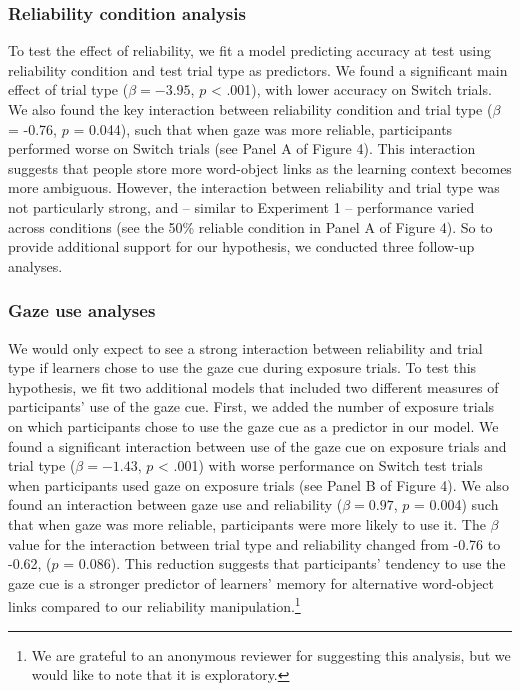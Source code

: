 \documentclass[oneside]{report}
\begin{document}
\subsubsection{Reliability condition
analysis}\label{reliability-condition-analysis}

To test the effect of reliability, we fit a model predicting accuracy at
test using reliability condition and test trial type as predictors. We
found a significant main effect of trial type (\(\beta = -3.95\), \(p\)
\textless{} .001), with lower accuracy on Switch trials. We also found
the key interaction between reliability condition and trial type
(\(\beta\) = -0.76, \(p\) = 0.044), such that when gaze was more
reliable, participants performed worse on Switch trials (see Panel A of
Figure 4). This interaction suggests that people store more word-object
links as the learning context becomes more ambiguous. However, the
interaction between reliability and trial type was not particularly
strong, and -- similar to Experiment 1 -- performance varied across
conditions (see the 50\% reliable condition in Panel A of Figure 4). So
to provide additional support for our hypothesis, we conducted three
follow-up analyses.

\subsubsection{Gaze use analyses}\label{gaze-use-analyses}

We would only expect to see a strong interaction between reliability and
trial type if learners chose to use the gaze cue during exposure trials.
To test this hypothesis, we fit two additional models that included two
different measures of participants' use of the gaze cue. First, we added
the number of exposure trials on which participants chose to use the
gaze cue as a predictor in our model. We found a significant interaction
between use of the gaze cue on exposure trials and trial type
(\(\beta = -1.43\), \(p\) \textless{} .001) with worse performance on
Switch test trials when participants used gaze on exposure trials (see
Panel B of Figure 4). We also found an interaction between gaze use and
reliability (\(\beta = 0.97\), \(p\) = 0.004) such that when gaze was
more reliable, participants were more likely to use it. The \(\beta\)
value for the interaction between trial type and reliability changed
from -0.76 to -0.62, (\(p\) = 0.086). This reduction suggests that
participants' tendency to use the gaze cue is a stronger predictor of
learners' memory for alternative word-object links compared to our
reliability manipulation.\footnote{We are grateful to an anonymous
  reviewer for suggesting this analysis, but we would like to note that
  it is exploratory.}
\end{document}
